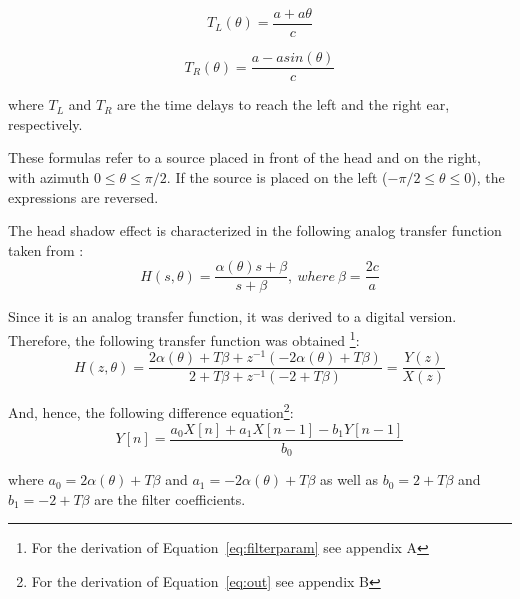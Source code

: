 \documentclass[journal]{IEEEtran}
\begin{document}
\begin{equation}\label{eq:ITDL}
T_{L} (\theta) = \frac{a+a\theta}{c}
\end{equation}

\begin{equation}\label{eq:ITDR}
T_{R} (\theta) = \frac{a-a sin(\theta)}{c}
\end{equation}

where $T_{L}$ and $T_{R}$ are the time delays to reach the left and the right ear, respectively. 

These formulas refer to a source placed in front of the head and on the right, with azimuth $0 \leq \theta \leq \pi/2$. If the source is placed on the left ($- \pi/2 \leq \theta \leq 0$), the expressions are reversed.



The head shadow effect is characterized in the following analog transfer function taken from \cite{Brown1997}:
\begin{equation}\label{eq:analog}
H\left( s,\theta\right) = \frac{\alpha (\theta)s+\beta}{s+\beta},\: where\:\beta = \frac{2c}{a}
\end{equation}


Since it is an analog transfer function, it was derived to a digital version. Therefore, the following transfer function was obtained \footnote{For the derivation of Equation~\ref{eq:filterparam} see appendix A}:
\begin{equation}\label{eq:filterparam}
H\left( z,\theta\right) = \frac{2\alpha (\theta)+T\beta+z^{-1}(-2\alpha(\theta)+T\beta)}{2+T\beta+z^{-1}(-2+T\beta)} = \frac{Y(z)}{X(z)}
\end{equation} 

And, hence, the following difference equation\footnote{For the derivation of Equation~\ref{eq:out} see appendix B}:
\begin{equation}\label{eq:out}
Y[n] =\frac{a_0X[n]+a_1X[n-1]-b_1Y[n-1]}{b_0}
\end{equation} 

where $a_0 = 2\alpha (\theta)+T\beta$ and $a_1 = -2\alpha(\theta)+T\beta$ as well as $b_0 = 2+T\beta$ and $b_1 = -2+T\beta$ are the filter coefficients.\\
\end{document}
